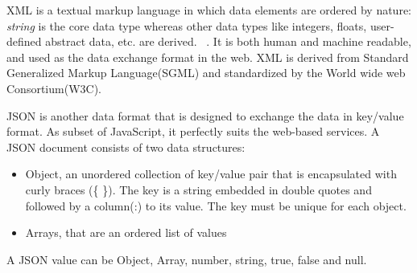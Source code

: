 XML is a textual markup language in which data elements are ordered by nature: \textit{string} is the core data type whereas other data types like integers, floats, user-defined abstract data, etc. are derived. ~\citep{xmark/original}. It is both human and machine readable, and  used as the data exchange format in the web. XML is derived from Standard Generalized Markup Language(SGML) and standardized by the World wide web Consortium(W3C).
\par
    JSON is another data format that is designed to exchange the data in key/value format. As subset of JavaScript, it perfectly suits the web-based services. A JSON document consists of two data structures:
\begin{itemize}
	\item Object, an unordered collection of key/value pair that is encapsulated with curly braces (\{ \}). The key is a string embedded in double quotes and followed by a column(:) to its value. The key must be unique for each object.
	\item Arrays, that are an ordered list of values
\end{itemize}
A JSON value can be Object, Array, number, string, true, false and null.
  

